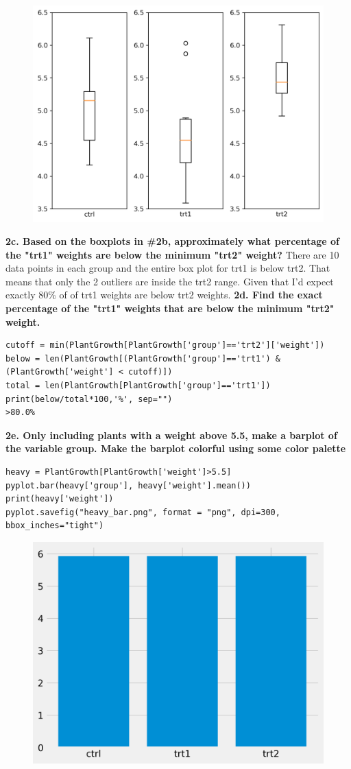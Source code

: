 \documentclass[preview, margin=0.5in]{standalone}
\begin{document}
\begin{figure}
    \includegraphics[]{weight_box.png}
\end{figure}
\textbf{2c. Based on the boxplots in \#2b, approximately what percentage of the "trt1" weights are below the minimum "trt2" weight?}
There are 10 data points in each group and the entire box plot for trt1 is below trt2. That means that only the 2 outliers are inside the trt2 range. Given that I'd expect exactly 80\% of of trt1 weights are below trt2 weights.
\textbf{2d. Find the exact percentage of the "trt1" weights that are below the minimum "trt2" weight.}
\begin{verbatim}
cutoff = min(PlantGrowth[PlantGrowth['group']=='trt2']['weight'])
below = len(PlantGrowth[(PlantGrowth['group']=='trt1') & (PlantGrowth['weight'] < cutoff)])
total = len(PlantGrowth[PlantGrowth['group']=='trt1'])
print(below/total*100,'%', sep="")
>80.0%
\end{verbatim}
\textbf{2e. Only including plants with a weight above 5.5, make a barplot of the variable group. Make the barplot colorful using some color palette}
\begin{verbatim}
heavy = PlantGrowth[PlantGrowth['weight']>5.5]
pyplot.bar(heavy['group'], heavy['weight'].mean())
print(heavy['weight'])
pyplot.savefig("heavy_bar.png", format = "png", dpi=300, bbox_inches="tight")
\end{verbatim}
\begin{figure}
    \includegraphics[]{heavy_bar.png}
\end{figure}
\end{document}
